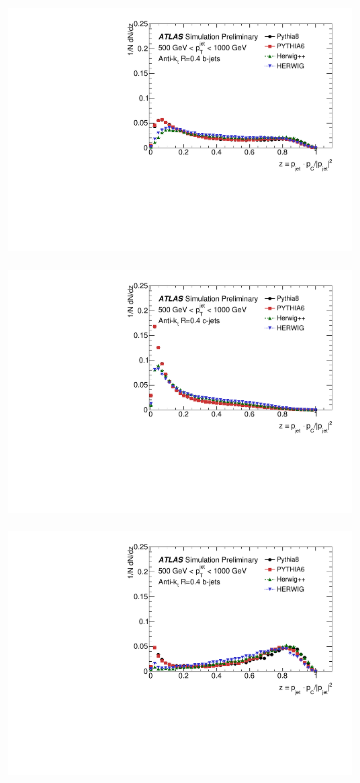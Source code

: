 \begin{figure}
\centering
 \begin{subfigure}[]{0.45\textwidth}
\includegraphics[width=\textwidth]{evtgen/figures/Frag/Jz4/WithIsolation/h_BFrag.pdf}
\end{subfigure}
 \begin{subfigure}[]{0.45\textwidth}
\includegraphics[width=\textwidth]{evtgen/figures/Frag/Jz4/WithIsolation/h_CFrag.pdf}
\end{subfigure}
  \begin{subfigure}[]{0.45\textwidth}
\includegraphics[width=\textwidth]{evtgen/figures/Frag/Jz4/WithIsolation/h_BFrag_SingleHad.pdf}

\end{subfigure}
\end{figure}
